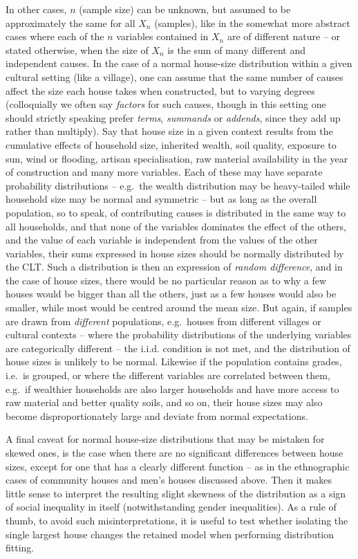 \documentclass[
  12pt,
  a4paper, twoside]{book}
\begin{document}
In other cases, \(n\) (sample size) can be unknown, but assumed to be approximately the same for all \(X_n\) (samples), like in the somewhat more abstract cases where each of the \(n\) variables contained in \(X_n\) are of different nature -- or stated otherwise, when the size of \(X_n\) is the sum of many different and independent causes. In the case of a normal house-size distribution within a given cultural setting (like a village), one can assume that the same number of causes affect the size each house takes when constructed, but to varying degrees (colloquially we often say \emph{factors} for such causes, though in this setting one should strictly speaking prefer \emph{terms}, \emph{summands} or \emph{addends}, since they add up rather than multiply). Say that house size in a given context results from the cumulative effects of household size, inherited wealth, soil quality, exposure to sun, wind or flooding, artisan specialisation, raw material availability in the year of construction and many more variables. Each of these may have separate probability distributions -- e.g.~the wealth distribution may be heavy-tailed while household size may be normal and symmetric -- but as long as the overall population, so to speak, of contributing causes is distributed in the same way to all households, and that none of the variables dominates the effect of the others, and the value of each variable is independent from the values of the other variables, their sums expressed in house sizes should be normally distributed by the CLT. Such a distribution is then an expression of \emph{random difference}, and in the case of house sizes, there would be no particular reason as to why a few houses would be bigger than all the others, just as a few houses would also be smaller, while most would be centred around the mean size. But again, if samples are drawn from \emph{different} populations, e.g.~houses from different villages or cultural contexts -- where the probability distributions of the underlying variables are categorically different -- the i.i.d. condition is not met, and the distribution of house sizes is unlikely to be normal. Likewise if the population contains grades, i.e.~is grouped, or where the different variables are correlated between them, e.g.~if wealthier households are also larger households and have more access to raw material and better quality soils, and so on, their house sizes may also become disproportionately large and deviate from normal expectations.

A final caveat for normal house-size distributions that may be mistaken for skewed ones, is the case when there are no significant differences between house sizes, except for one that has a clearly different function -- as in the ethnographic cases of community houses and men's houses discussed above. Then it makes little sense to interpret the resulting slight skewness of the distribution as a sign of social inequality in itself (notwithstanding gender inequalities). As a rule of thumb, to avoid such misinterpretations, it is useful to test whether isolating the single largest house changes the retained model when performing distribution fitting.
\end{document}
